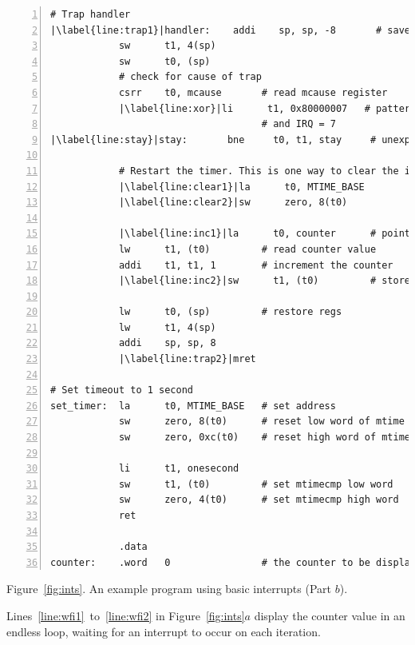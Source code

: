 \documentclass[11pt, twoside, pdftex]{article}
\begin{document}
\begin{center}
\begin{minipage}[h]{15 cm}
\begin{lstlisting}[style=defaultNiosVStyle, name=ints, numbers=left, escapechar=|]
# Trap handler
|\label{line:trap1}|handler:    addi    sp, sp, -8       # save regs that will be modified
            sw      t1, 4(sp)
            sw      t0, (sp)
            # check for cause of trap
            csrr    t0, mcause       # read mcause register
            |\label{line:xor}|li      t1, 0x80000007   # pattern to check interrupt bit
                                     # and IRQ = 7
|\label{line:stay}|stay:       bne     t0, t1, stay     # unexpected cause of exception
            
            # Restart the timer. This is one way to clear the interrupt
            |\label{line:clear1}|la      t0, MTIME_BASE
            |\label{line:clear2}|sw      zero, 8(t0)

            |\label{line:inc1}|la      t0, counter      # pointer to counter
            lw      t1, (t0)         # read counter value
            addi    t1, t1, 1        # increment the counter
            |\label{line:inc2}|sw      t1, (t0)         # store counter to memory

            lw      t0, (sp)         # restore regs
            lw      t1, 4(sp)
            addi    sp, sp, 8
            |\label{line:trap2}|mret

# Set timeout to 1 second
set_timer:  la      t0, MTIME_BASE   # set address
            sw      zero, 8(t0)      # reset low word of mtime
            sw      zero, 0xc(t0)    # reset high word of mtime
            
            li      t1, onesecond
            sw      t1, (t0)         # set mtimecmp low word
            sw      zero, 4(t0)      # set mtimecmp high word
            ret
     
            .data
counter:    .word   0                # the counter to be displayed\end{lstlisting}

\vspace{0.25in}
Figure~\ref{fig:ints}.	An example program using basic interrupts (Part $b$).
\end{minipage}
\end{center}

Lines~\ref{line:wfi1}~to~\ref{line:wfi2} in Figure~\ref{fig:ints}$a$ 
display the counter value in an endless loop,
waiting for an interrupt to occur on each iteration. 
\end{document}
